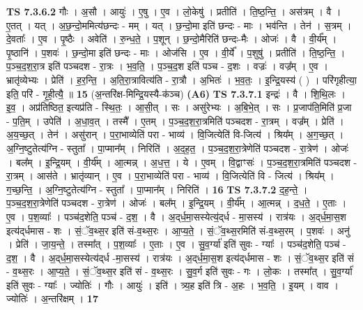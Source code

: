 \documentclass[17pt]{extarticle}
\begin{document}
                                \textbf{ TS 7.3.6.2} \newline
                  गौः । अ॒सौ । आयुः॑ । ए॒षु । ए॒व । लो॒केषु॑ । प्रतीति॑ । ति॒ष्ठ॒न्ति॒ । अस॑त्रम् । वै । ए॒तत् । यत् । अ॒छ॒न्दो॒ममित्य॑छन्दः - मम् । यत् । छ॒न्दो॒मा इति॑ छन्दः - माः । भव॑न्ति । तेन॑ । स॒त्रम् । दे॒वताः᳚ । ए॒व । पृ॒ष्ठैः । अवेति॑ । रु॒न्ध॒ते॒ । प॒शून् । छ॒न्दो॒मैरिति॑ छन्दः-मैः । ओजः॑ । वै । वी॒र्य᳚म् । पृ॒ष्ठानि॑ । प॒शवः॑ । छ॒न्दो॒मा इति॑ छन्दः - माः । ओज॑सि । ए॒व । वी॒र्ये᳚ । प॒शुषु॑ । प्रतीति॑ । ति॒ष्ठ॒न्ति॒ । प॒ञ्च॒द॒श॒रा॒त्र इति॑ पञ्चदश - रा॒त्रः । भ॒व॒ति॒ । प॒ञ्च॒द॒श इति॑ पञ्च - द॒शः । वज्रः॑ । वज्र᳚म् । ए॒व । भ्रातृ॑व्येभ्यः । प्रेति॑ । ह॒र॒न्ति॒ । अ॒ति॒रा॒त्रावित्य॑ति - रा॒त्रौ । अ॒भितः॑ । भ॒व॒तः॒ । इ॒न्द्रि॒यस्य॑ ( ) । परि॑गृहीत्या॒ इति॒ परि॑ - गृ॒ही॒त्यै॒ ॥ \textbf{  15 } \newline
                  \newline
                      (अ॒न्तरि॑क्ष-मिन्द्रि॒यस्यै-क॑ञ्च)  \textbf{(A6)} \newline \newline
                                \textbf{ TS 7.3.7.1} \newline
                  इन्द्रः॑ । वै । शि॒थि॒लः । इ॒व॒ । अप्र॑तिष्ठित॒ इत्यप्र॑ति - स्थि॒तः॒ । आ॒सी॒त् । सः । असु॑रेभ्यः । अ॒बि॒भे॒त् । सः । प्र॒जाप॑ति॒मिति॑ प्र॒जा - प॒ति॒म् । उपेति॑ । अ॒धा॒व॒त् । तस्मै᳚ । ए॒तम् । प॒ञ्च॒द॒श॒रा॒त्रमिति॑ पञ्चदश - रा॒त्रम् । वज्र᳚म् । प्रेति॑ । अ॒य॒च्छ॒त् । तेन॑ । असु॑रान् । प॒रा॒भाव्येति॑ परा - भाव्य॑ । वि॒जित्येति॑ वि-जित्य॑ । श्रिय᳚म् । अ॒ग॒च्छ॒त् । अ॒ग्नि॒ष्टुतेत्य॑ग्नि - स्तुता᳚ । पा॒प्मान᳚म् । निरिति॑ । अ॒द॒ह॒त॒ । प॒ञ्च॒द॒श॒रा॒त्रेणेति॑ पञ्चदश - रा॒त्रेण॑ । ओजः॑ । बल᳚म् । इ॒न्द्रि॒यम् । वी॒र्य᳚म् । आ॒त्मन्न् । अ॒ध॒त्त॒ । ये । ए॒वम् । वि॒द्वाꣳसः॑ । प॒ञ्च॒द॒श॒रा॒त्रमिति॑ पञ्चदश - रा॒त्रम् । आस॑ते । भ्रातृ॑व्यान् । ए॒व । प॒रा॒भाव्येति॑ परा - भाव्य॑ । वि॒जित्येति॑ वि - जित्य॑ । श्रिय᳚म् । ग॒च्छ॒न्ति॒ । अ॒ग्नि॒ष्टुतेत्य॑ग्नि - स्तुता᳚ । पा॒प्मान᳚म् । निरिति॑ । \textbf{  16} \newline
                  \newline
                                \textbf{ TS 7.3.7.2} \newline
                  द॒ह॒न्ते॒ । प॒ञ्च॒द॒श॒रा॒त्रेणेति॑ पञ्चदश - रा॒त्रेण॑ । ओजः॑ । बल᳚म् । इ॒न्द्रि॒यम् । वी॒र्य᳚म् । आ॒त्मन्न् । द॒ध॒ते॒ । ए॒ताः । ए॒व । प॒श॒व्याः᳚ । पञ्च॑द॒शेति॒ पञ्च॑ - द॒श॒ । वै । अ॒द्‌र्ध॒मा॒सस्येत्य॒॑द्‌र्ध - मा॒सस्य॑ । रात्र॑यः । अ॒द्‌र्ध॒मा॒स॒श इत्य॑द्‌र्धमास - शः । सं॒ॅव॒थ्स॒र इति॑ सं-व॒थ्स॒रः । आ॒प्य॒ते॒ । सं॒ॅव॒थ्स॒रमिति॑ सं-व॒थ्स॒रम् । प॒शवः॑ । अनु॑ । प्रेति॑ । जा॒य॒न्ते॒ । तस्मा᳚त् । प॒श॒व्याः᳚ । ए॒ताः । ए॒व । सु॒व॒र्ग्या॑ इति॑ सुवः - ग्याः᳚ । पञ्च॑द॒शेति॒ पञ्च॑ - द॒श॒ । वै । अ॒द्‌र्ध॒मा॒सस्येत्य॑द्‌र्ध -मा॒सस्य॑ । रात्र॑यः । अ॒द्‌र्ध॒मा॒स॒श इत्य॑द्‌र्धमास - शः । सं॒ॅव॒थ्स॒र इति॑ सं - व॒थ्स॒रः । आ॒प्य॒ते॒ । सं॒ॅव॒थ्स॒र इति॑ सं - व॒थ्स॒रः । सु॒व॒र्ग इति॑ सुवः - गः । लो॒कः । तस्मा᳚त् । सु॒व॒र्ग्या॑ इति॑ सुवः - ग्याः᳚ । ज्योतिः॑ । गौः । आयुः॑ । इति॑ । त्र्य॒ह इति॑ त्रि - अ॒हः । भ॒व॒ति॒ । इ॒यम् । वाव । ज्योतिः॑ । अ॒न्तरि॑क्षम् । \textbf{  17} \newline
\end{document}

